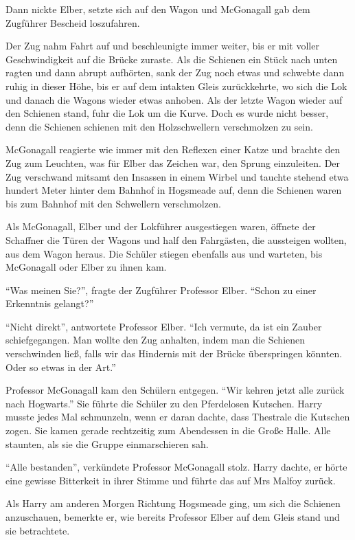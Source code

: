 Dann nickte Elber, setzte sich auf den Wagon und McGonagall gab dem Zugführer Bescheid loszufahren.

Der Zug nahm Fahrt auf und beschleunigte immer weiter, bis er mit voller Geschwindigkeit auf die Brücke zuraste. Als die Schienen ein Stück nach unten ragten und dann abrupt aufhörten, sank der Zug noch etwas und schwebte dann ruhig in dieser Höhe, bis er auf dem intakten Gleis zurückkehrte, wo sich die Lok und danach die Wagons wieder etwas anhoben. Als der letzte Wagon wieder auf den Schienen stand, fuhr die Lok um die Kurve. Doch es wurde nicht besser, denn die Schienen schienen mit den Holzschwellern verschmolzen zu sein.

McGonagall reagierte wie immer mit den Reflexen einer Katze und brachte den Zug zum Leuchten, was für Elber das Zeichen war, den Sprung einzuleiten. Der Zug verschwand mitsamt den Insassen in einem Wirbel und tauchte stehend etwa hundert Meter hinter dem Bahnhof in Hogsmeade auf, denn die Schienen waren bis zum Bahnhof mit den Schwellern verschmolzen.

Als McGonagall, Elber und der Lokführer ausgestiegen waren, öffnete der Schaffner die Türen der Wagons und half den Fahrgästen, die aussteigen wollten, aus dem Wagon heraus. Die Schüler stiegen ebenfalls aus und warteten, bis McGonagall oder Elber zu ihnen kam.

\enquote{Was meinen Sie?}, fragte der Zugführer Professor Elber. \enquote{Schon zu einer Erkenntnis gelangt?}

\enquote{Nicht direkt}, antwortete Professor Elber. \enquote{Ich vermute, da ist ein Zauber schiefgegangen. Man wollte den Zug anhalten, indem man die Schienen verschwinden ließ, falls wir das Hindernis mit der Brücke überspringen könnten. Oder so etwas in der Art.}

Professor McGonagall kam den Schülern entgegen. \enquote{Wir kehren jetzt alle zurück nach Hogwarts.} Sie führte die Schüler zu den Pferdelosen Kutschen. Harry musste jedes Mal schmunzeln, wenn er daran dachte, dass Thestrale die Kutschen zogen. Sie kamen gerade rechtzeitig zum Abendessen in die Große Halle. Alle staunten, als sie die Gruppe einmarschieren sah.

\enquote{Alle bestanden}, verkündete Professor McGonagall stolz. Harry dachte, er hörte eine gewisse Bitterkeit in ihrer Stimme und führte das auf Mrs Malfoy zurück.

Als Harry am anderen Morgen Richtung Hogsmeade ging, um sich die Schienen anzuschauen, bemerkte er, wie bereits Professor Elber auf dem Gleis stand und sie betrachtete.

